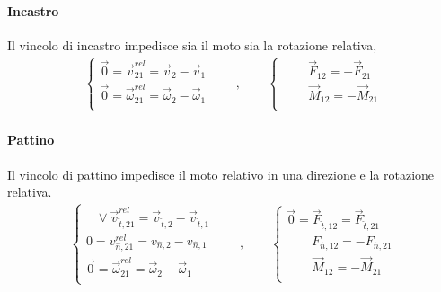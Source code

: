 \documentclass[letterpaper,10pt,italian]{jupyterBook}
\begin{document}
\paragraph{Incastro}
\label{\detokenize{ch/mechanics/actions-examples:incastro}}\label{\detokenize{ch/mechanics/actions-examples:physics-hs-mechanics-actions-contact-ideal-constraints-fix}}
\sphinxAtStartPar
Il vincolo di incastro impedisce sia il moto sia la rotazione relativa,
\begin{equation*}
\begin{split}
\begin{cases}
  \vec{0} = \vec{v}^{rel}_{21}     = \vec{v}_{2}     - \vec{v}_{1} \\
  \vec{0} = \vec{\omega}^{rel}_{21} = \vec{\omega}_{2} - \vec{\omega}_{1} \\
\end{cases}
\qquad , \qquad
\begin{cases}
  \qquad \vec{F}_{12} = - \vec{F}_{21} \\
  \qquad \vec{M}_{12} = - \vec{M}_{21} \\
\end{cases}
\end{split}
\end{equation*}

\paragraph{Pattino}
\label{\detokenize{ch/mechanics/actions-examples:pattino}}\label{\detokenize{ch/mechanics/actions-examples:physics-hs-mechanics-actions-contact-ideal-constraints-skate}}
\sphinxAtStartPar
Il vincolo di pattino impedisce il moto relativo in una direzione e la rotazione relativa.
\begin{equation*}
\begin{split}
\begin{cases}
  \quad \forall \ \vec{v}^{rel}_{\hat{t},21}     = \vec{v}_{\hat{t},2}     - \vec{v}_{\hat{t},1} \\
          0  = v^{rel}_{\hat{n},21}     = v_{\hat{n},2}     - v_{\hat{n},1} \\
  \vec{0} = \vec{\omega}^{rel}_{21} = \vec{\omega}_{2} - \vec{\omega}_{1} \\
\end{cases}
\qquad , \qquad
\begin{cases}
  \vec{0} = \vec{F}_{\hat{t},12} = \vec{F}_{\hat{t},21} \\
  \qquad F_{\hat{n},12} = - F_{\hat{n},21} \\
  \qquad \vec{M}_{12} = - \vec{M}_{21} \\
\end{cases}
\end{split}
\end{equation*}
\end{document}
